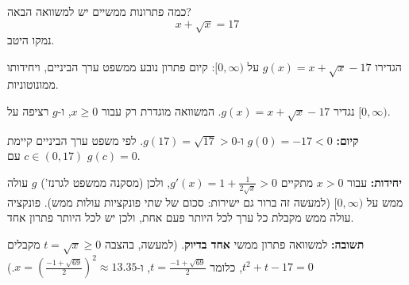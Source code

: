
\begin{question}
כמה פתרונות ממשיים יש למשוואה הבאה?
\[ x + \sqrt{x} = 17 \]
נמקו היטב.
\end{question}

\begin{hint}
הגדירו $g(x) = x + \sqrt{x} - 17$ על $[0,\infty)$: קיום פתרון נובע ממשפט ערך הביניים, ויחידותו ממונוטוניות.
\end{hint}

\begin{solution}
נגדיר $g(x) = x + \sqrt{x} - 17$. המשוואה מוגדרת רק עבור $x \ge 0$, ו-$g$ רציפה על $[0,\infty)$.

\textbf{קיום:} $g(0) = -17 < 0$ ו-$g(17) = \sqrt{17} > 0$. לפי משפט ערך הביניים קיימת $c \in (0,17)$ עם $g(c) = 0$.

\textbf{יחידות:} עבור $x > 0$ מתקיים $g'(x) = 1 + \frac{1}{2\sqrt{x}} > 0$, ולכן (מסקנה ממשפט לגרנז') $g$ עולה ממש על $[0,\infty)$
(למעשה זה ברור גם ישירות: סכום של שתי פונקציות עולות ממש). פונקציה עולה ממש מקבלת כל ערך לכל היותר פעם אחת, ולכן יש לכל היותר פתרון אחד.

\textbf{תשובה:} למשוואה פתרון ממשי \textbf{אחד בדיוק}. (למעשה, בהצבה $t = \sqrt{x}\ge 0$ מקבלים $t^2 + t - 17 = 0$, כלומר $t = \frac{-1+\sqrt{69}}{2}$, ו-$x = \left(\frac{-1+\sqrt{69}}{2}\right)^2 \approx 13.35$.)
\end{solution}
